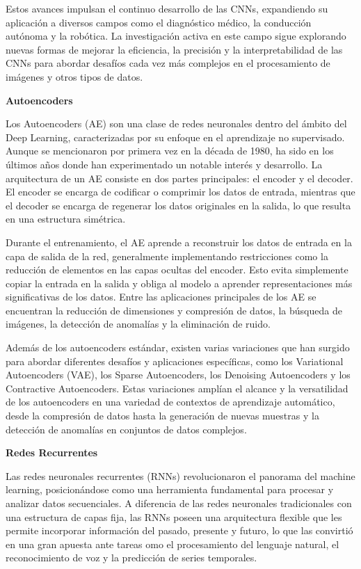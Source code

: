 \documentclass[
  a4paper,
  DIV=11,
  numbers=noendperiod]{scrreprt}
\begin{document}
Estos avances impulsan el continuo desarrollo de las CNNs, expandiendo
su aplicación a diversos campos como el diagnóstico médico, la
conducción autónoma y la robótica. La investigación activa en este campo
sigue explorando nuevas formas de mejorar la eficiencia, la precisión y
la interpretabilidad de las CNNs para abordar desafíos cada vez más
complejos en el procesamiento de imágenes y otros tipos de datos.

\textbf{Autoencoders}

Los Autoencoders (AE) son una clase de redes neuronales dentro del
ámbito del Deep Learning, caracterizadas por su enfoque en el
aprendizaje no supervisado. Aunque se mencionaron por primera vez en la
década de 1980, ha sido en los últimos años donde han experimentado un
notable interés y desarrollo. La arquitectura de un AE consiste en dos
partes principales: el encoder y el decoder. El encoder se encarga de
codificar o comprimir los datos de entrada, mientras que el decoder se
encarga de regenerar los datos originales en la salida, lo que resulta
en una estructura simétrica.

Durante el entrenamiento, el AE aprende a reconstruir los datos de
entrada en la capa de salida de la red, generalmente implementando
restricciones como la reducción de elementos en las capas ocultas del
encoder. Esto evita simplemente copiar la entrada en la salida y obliga
al modelo a aprender representaciones más significativas de los datos.
Entre las aplicaciones principales de los AE se encuentran la reducción
de dimensiones y compresión de datos, la búsqueda de imágenes, la
detección de anomalías y la eliminación de ruido.

Además de los autoencoders estándar, existen varias variaciones que han
surgido para abordar diferentes desafíos y aplicaciones específicas,
como los Variational Autoencoders (VAE), los Sparse Autoencoders, los
Denoising Autoencoders y los Contractive Autoencoders. Estas variaciones
amplían el alcance y la versatilidad de los autoencoders en una variedad
de contextos de aprendizaje automático, desde la compresión de datos
hasta la generación de nuevas muestras y la detección de anomalías en
conjuntos de datos complejos.

\textbf{Redes Recurrentes}

Las redes neuronales recurrentes (RNNs) revolucionaron el panorama del
machine learning, posicionándose como una herramienta fundamental para
procesar y analizar datos secuenciales. A diferencia de las redes
neuronales tradicionales con una estructura de capas fija, las RNNs
poseen una arquitectura flexible que les permite incorporar información
del pasado, presente y futuro, lo que las convirtió en una gran apuesta
ante tareas omo el procesamiento del lenguaje natural, el reconocimiento
de voz y la predicción de series temporales.
\end{document}
